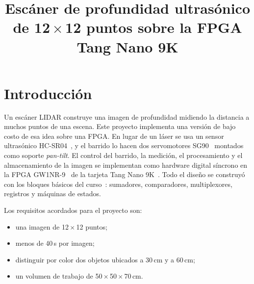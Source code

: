 \documentclass[conference]{IEEEtran}
\begin{document}
\title{Escáner de profundidad ultrasónico de 12\,$\times$\,12 puntos sobre la FPGA Tang Nano 9K}

\author{
\and
{}
}

\maketitle

\section{Introducción}

Un escáner LIDAR construye una imagen de profundidad midiendo la distancia a muchos puntos de una escena. Este proyecto implementa una versión de bajo costo de esa idea sobre una FPGA. En lugar de un láser se usa un sensor ultrasónico HC-SR04~\cite{hcsr04}, y el barrido lo hacen dos servomotores SG90~\cite{sg90} montados como soporte \emph{pan-tilt}. El control del barrido, la medición, el procesamiento y el almacenamiento de la imagen se implementan como hardware digital síncrono en la FPGA GW1NR-9~\cite{gw1nr} de la tarjeta Tang Nano 9K~\cite{tangnano}. Todo el diseño se construyó con los bloques básicos del curso~\cite{harris}: sumadores, comparadores, multiplexores, registros y máquinas de estados.

Los requisitos acordados para el proyecto son:
\begin{itemize}
\item una imagen de 12\,$\times$\,12 puntos;
\item menos de 40\,s por imagen;
\item distinguir por color dos objetos ubicados a 30\,cm y a 60\,cm;
\item un volumen de trabajo de 50\,$\times$\,50\,$\times$\,70\,cm.
\end{itemize}
\end{document}
